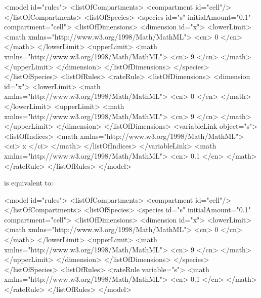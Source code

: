 \documentclass{cekarticle}
\begin{document}
\begin{example}
<model id="rules">
    <listOfCompartments>
        <compartment id="cell"/>
    </listOfCompartments>
    <listOfSpecies>
        <species id="s" initialAmount="0.1" compartment="cell">
            <listOfDimensions>
                <dimension id="x">
                    <lowerLimit>
                        <math xmlns="http://www.w3.org/1998/Math/MathML">
                            <cn> 0 </cn>
                        </math>
                    </lowerLimit>
                    <upperLimit>
                        <math xmlns="http://www.w3.org/1998/Math/MathML">
                            <cn> 9 </cn>
                        </math>
                    </upperLimit>
                </dimension>
            </listOfDimensions>
        </species>
    </listOfSpecies>
    <listOfRules>
        <rateRule>
            <listOfDimensions>
                <dimension id="x">
                    <lowerLimit>
                        <math xmlns="http://www.w3.org/1998/Math/MathML">
                            <cn> 0 </cn>
                        </math>
                    </lowerLimit>
                    <upperLimit>
                        <math xmlns="http://www.w3.org/1998/Math/MathML">
                            <cn> 9 </cn>
                        </math>
                    </upperLimit>
                </dimension>
            </listOfDimensions>
            <variableLink object="s">
                <listOfIndices>
                    <math xmlns="http://www.w3.org/1998/Math/MathML">
                        <ci> x </ci>
                    </math>
                </listOfIndices>
            </variableLink>
            <math xmlns="http://www.w3.org/1998/Math/MathML">
                <cn> 0.1 </cn>
            </math>
        </rateRule>
    </listOfRules>
</model>
\end{example}

is equivalent to:

\begin{example}
<model id="rules">
    <listOfCompartments>
        <compartment id="cell"/>
    </listOfCompartments>
    <listOfSpecies>
        <species id="s" initialAmount="0.1" compartment="cell">
            <listOfDimensions>
                <dimension id="x">
                    <lowerLimit>
                        <math xmlns="http://www.w3.org/1998/Math/MathML">
                            <cn> 0 </cn>
                        </math>
                    </lowerLimit>
                    <upperLimit>
                        <math xmlns="http://www.w3.org/1998/Math/MathML">
                            <cn> 9 </cn>
                        </math>
                    </upperLimit>
                </dimension>
            </listOfDimensions>
        </species>
    </listOfSpecies>
    <listOfRules>
        <rateRule variable="s">
            <math xmlns="http://www.w3.org/1998/Math/MathML">
                <cn> 0.1 </cn>
            </math>
        </rateRule>
    </listOfRules>
</model>
\end{example}
\end{document}

